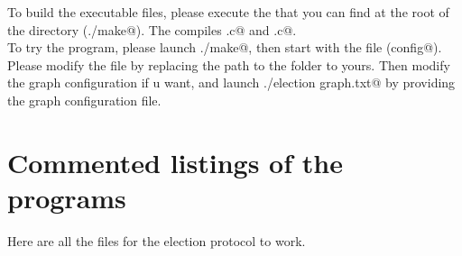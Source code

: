 \documentclass{article}
\begin{document}
To build the executable files, please execute the \verb@makefile@ that you can find at the root of the directory (\verb@./make@). The \verb@makefile@ compiles \verb@election.c@ and \verb@node.c@.\\

To try the program, please launch \verb@./make@, then start \verb@pvm@ with the \verb@config@ file (\verb@pvm config@). Please modify the \verb@config@ file by replacing the path to the \verb@code@ folder to yours. Then modify the graph configuration if u want, and launch \verb@./election graph.txt@ by providing the graph configuration file.

\section{Commented listings of the programs}
Here are all the files for the election protocol to work.






\end{document}
